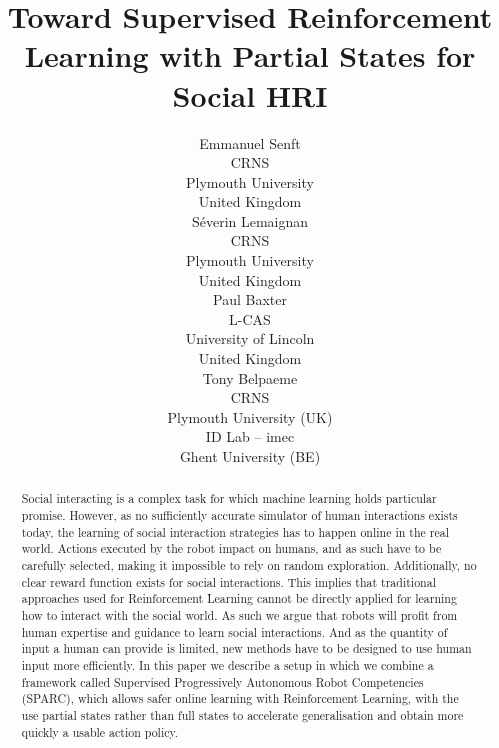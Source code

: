 \documentclass[letterpaper]{article} %
\begin{document}
%
\title{Toward Supervised Reinforcement Learning with Partial States for Social HRI}

\author{Emmanuel Senft \\
CRNS \\
Plymouth University \\
United Kingdom\\
\And S\'{e}verin Lemaignan\\
CRNS \\
Plymouth University \\
United Kingdom\\
\And Paul Baxter\\
L-CAS\\
University of Lincoln\\
United Kingdom\\
 \And Tony Belpaeme\\
 CRNS\\ Plymouth University (UK) \\ ID Lab -- imec \\ Ghent University (BE)}

\maketitle 

\begin{abstract}

    Social interacting is a complex task for which machine learning holds
    particular promise. However, as no sufficiently accurate simulator of human
    interactions exists today, the learning of social interaction strategies has
    to happen online in the real world. Actions executed by the robot impact on
    humans, and as such have to be carefully selected, making it impossible to
    rely on random exploration. Additionally, no clear reward function exists
    for social interactions. This implies that traditional approaches used for
    Reinforcement Learning cannot be directly applied for learning how to
    interact with the social world. As such we argue that robots will profit
    from human expertise and guidance to learn social interactions. And as the
    quantity of input a human can provide is limited, new methods have to be
    designed to use human input more efficiently. In this paper we describe a
    setup in which we combine a framework called Supervised Progressively
    Autonomous Robot Competencies (SPARC), which allows safer online learning
    with Reinforcement Learning, with the use partial states rather than full
    states to accelerate generalisation and obtain more quickly a usable action
    policy.

\end{abstract}
\end{document}
